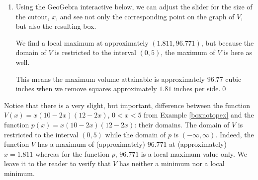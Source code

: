 \documentclass{ximera}
\begin{document}
\begin{example}
\begin{enumerate}

To find a suitable applied domain, we note that to make a box at all we need $x > 0$.  Also the shorter of the two dimensions of the cardboard is $10$ inches, and since we are removing $2x$ inches from this dimension, we also require $10 - 2x > 0$ or $x < 5$.  Hence, our applied domain is $0 < x < 5$.

\item  Using the GeoGebra interactive below, we can adjust the slider for the size of the cutout, $x$, and see not only the corresponding point on the graph of $V$, but also the resulting box.  





\begin{center}
\end{center}

We find a local maximum at approximately $(1.811, 96.771)$, but because the domain of $V$ is restricted to the interval $(0,5)$, the maximum of $V$ is here as well.

This means the maximum volume attainable is approximately $96.77$ cubic inches when we remove squares approximately $1.81$ inches per side.\qed
 
\end{enumerate}
\label{openbox}
\end{example}

Notice that there is a very slight, but important, difference between the function $V(x) = x(10-2x)(12-2x)$, $0 < x < 5$ from Example  \ref{boxnotopex} and the function $p(x) = x(10-2x)(12-2x)$: their domains.  The domain of $V$ is restricted to the interval $(0,5)$ while the domain of $p$ is $(-\infty, \infty)$.  Indeed, the function $V$ has a maximum of (approximately) $96.771$ at (approximately) $x = 1.811$ whereas for the function $p$, $96.771$ is a local maximum value only.  We leave it to the reader to verify that $V$ has neither a minimum nor a local minimum.



\closegraphsfile
\end{document}
